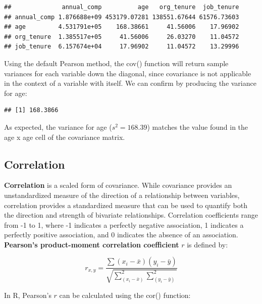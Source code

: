 \documentclass[]{book}
\newenvironment{Shaded}{\begin{snugshade}}{\end{snugshade}}
\newcommand{\CommentTok}[1]{\textcolor[rgb]{0.56,0.35,0.01}{\textit{#1}}}
\newcommand{\KeywordTok}[1]{\textcolor[rgb]{0.13,0.29,0.53}{\textbf{#1}}}
\newcommand{\NormalTok}[1]{#1}
\newcommand{\OperatorTok}[1]{\textcolor[rgb]{0.81,0.36,0.00}{\textbf{#1}}}
\begin{document}
\begin{verbatim}
##              annual_comp          age   org_tenure  job_tenure
## annual_comp 1.876688e+09 453179.07281 138551.67644 61576.73603
## age         4.531791e+05    168.38661     41.56006    17.96902
## org_tenure  1.385517e+05     41.56006     26.03270    11.04572
## job_tenure  6.157674e+04     17.96902     11.04572    13.29996
\end{verbatim}

Using the default Pearson method, the cov() function will return sample variances for each variable down the diagonal, since covariance is not applicable in the context of a variable with itself. We can confirm by producing the variance for age:

\begin{Shaded}
\end{Shaded}

\begin{verbatim}
## [1] 168.3866
\end{verbatim}

As expected, the variance for age (\(s^{2} = 168.39\)) matches the value found in the age x age cell of the covariance matrix.

\hypertarget{correlation}{%
\subsection{Correlation}\label{correlation}}

\textbf{Correlation} is a scaled form of covariance. While covariance provides an unstandardized measure of the direction of a relationship between variables, correlation provides a standardized measure that can be used to quantify both the direction and strength of bivariate relationships. Correlation coefficients range from -1 to 1, where -1 indicates a perfectly negative association, 1 indicates a perfectly positive association, and 0 indicates the absence of an association. \textbf{Pearson's product-moment correlation coefficient} \(r\) is defined by:

\[ r_{x,y} = \frac{\sum(x_{i}-\bar{x})(y_{i}-\bar{y})}{\sqrt{\sum_(x_{i}-\bar{x})^2\sum_(y_{i}-\bar{y})^2}} \]

In R, Pearson's \(r\) can be calculated using the cor() function:
\end{document}
